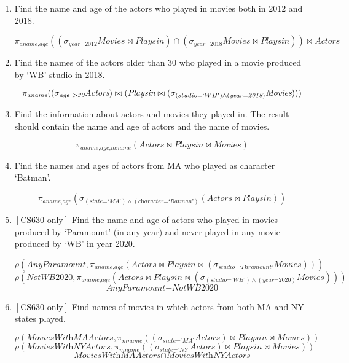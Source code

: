 \documentclass[letterpaper, 11pt]{article}
\begin{document}
\begin{enumerate}[label={\alph*}),leftmargin=*]
\begin{tcolorbox}
    \end{tcolorbox}    
    \item Find the name and age of the actors who played in movies both in 2012 and 2018.
    \begin{tcolorbox}
    \[\pi_{\textit{aname,age}}((\sigma_{\textit{year=2012}}\textit{Movies} \bowtie \textit{Playsin}) \cap (\sigma_{\textit{year=2018}}\textit{Movies} \bowtie \textit{Playsin})) \bowtie \textit{Actors}\]
    \end{tcolorbox}    
    \item Find the names of the actors older than 30 who played in a movie produced by `WB' studio in 2018.
    \begin{tcolorbox}
    \[\pi_{\textit{aname}}((\sigma_{\textit{age \textgreater 30}}\textit{Actors}) \bowtie (\textit{Playsin} \bowtie (\sigma_{(studio=`WB') \wedge (\textit{year=2018})}\textit{Movies})))\]
    \end{tcolorbox}    
    \item Find the information about actors and movies they played in. The result should contain the name and age of actors and the name of movies.
    \begin{tcolorbox}
    \[\pi_{\textit{aname,age,mname}}(\textit{Actors} \bowtie \textit{Playsin} \bowtie \textit{Movies})\]
    \end{tcolorbox}    
    \item Find the names and ages of actors from MA who played as character `Batman'.
    \begin{tcolorbox}
    \[\pi_{\textit{aname,age}}(\sigma_{(\textit{state=`MA'})\wedge (\textit{character=`Batman'})}(\textit{Actors} \bowtie \textit{Playsin}))\]
    \end{tcolorbox}    
    \item $\left[\text{CS630 only}\right]$ Find the name and age of actors who played in movies produced by `Paramount' (in any year) and never played in any movie produced by `WB' in year 2020.
    \begin{tcolorbox}
    \[\rho(\textit{AnyParamount}, \pi_{\textit{aname,age}}(\textit{Actors} \bowtie \textit{Playsin} \bowtie (\sigma_{\textit{studio=`Paramount'}}\textit{Movies})))\]
    \[\rho(\textit{NotWB2020}, \pi_{\textit{aname,age}}(\textit{Actors} \bowtie \textit{Playsin} \bowtie (\sigma_{(\textit{studio=`WB'}) \wedge (\textit{year=2020})}\textit{Movies})))\]
    \[\textit{AnyParamount} - \textit{NotWB2020}\]
    \end{tcolorbox}
    \item $\left[\text{CS630 only}\right]$ Find names of movies in which actors from both MA and NY states played.
    \begin{tcolorbox}
    \[\rho(\textit{MoviesWithMAActors}, \pi_{\textit{mname}}((\sigma_{\textit{state=`MA'}}\textit{Actors}) \bowtie \textit{Playsin} \bowtie \textit{Movies}))\]
    \[\rho(\textit{MoviesWithNYActors}, \pi_{\textit{mname}}((\sigma_{\textit{state=`NY'}}\textit{Actors}) \bowtie \textit{Playsin} \bowtie \textit{Movies}))\]
    \[\textit{MoviesWithMAActors} \cap \textit{MoviesWithNYActors}\]
    \end{tcolorbox}
\end{enumerate}
\end{document}
